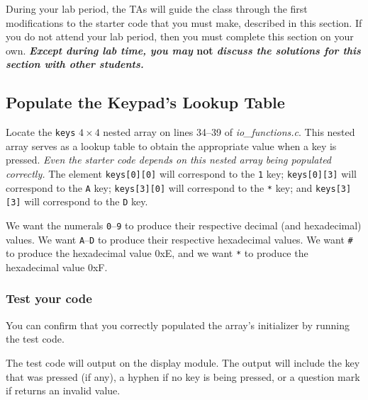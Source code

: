 During your lab period, the TAs will guide the class through the first modifications to the starter code that you must make, described in this section.
If you do not attend your lab period, then you must complete this section on your own.
\textbf{\textit{Except during lab time, you may }not\textit{ discuss the solutions for this section with other students.}}




\subsection{Populate the Keypad's Lookup Table} \label{subsec:populatekeypad}

Locate the \lstinline{keys} $4 \times 4$ nested array on lines 34--39 of \textit{io\_functions.c}.
This nested array serves as a lookup table to obtain the appropriate value when a key is pressed.
\textit{Even the starter code depends on this nested array being populated correctly.}
The element \lstinline{keys[0][0]} will correspond to the \texttt{1} key;
\lstinline{keys[0][3]} will correspond to the \texttt{A} key;
\lstinline{keys[3][0]} will correspond to the \texttt{*} key;
and \lstinline{keys[3][3]} will correspond to the \texttt{D} key.

We want the numerals \texttt{0}--\texttt{9} to produce their respective decimal (and hexadecimal) values.
We want \texttt{A}--\texttt{D} to produce their respective hexadecimal values.
We want \texttt{\#} to produce the hexadecimal value 0xE, and we want \texttt{*} to produce the hexadecimal value 0xF\@.

\begin{description}
\end{description}

\subsubsection*{Test your code}

You can confirm that you correctly populated the array's initializer by running the test code.
\begin{description}
\end{description}
The test code will output on the display module.
The output will include the key that was pressed (if any), a hyphen if no key is being pressed, or a question mark if  returns an invalid value.

